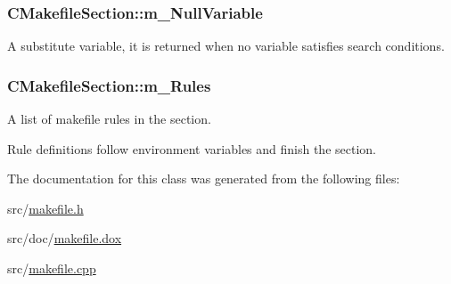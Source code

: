 \hypertarget{classCMakefileSection_ad9819eeb550fafffcfe7814ffd859cdd}{
\subsubsection[{m\-\_\-\-Null\-Variable}]{\setlength{\rightskip}{0pt plus 5cm}C\-Makefile\-Section\-::m\-\_\-\-Null\-Variable\hspace{0.3cm}{\ttfamily [private]}}}\label{classCMakefileSection_ad9819eeb550fafffcfe7814ffd859cdd}


A substitute variable, it is returned when no variable satisfies search conditions. 

\hypertarget{classCMakefileSection_aa5ba1d41937450d96795e4e08cb64f49}{
\subsubsection[{m\-\_\-\-Rules}]{\setlength{\rightskip}{0pt plus 5cm}C\-Makefile\-Section\-::m\-\_\-\-Rules\hspace{0.3cm}{\ttfamily [private]}}}\label{classCMakefileSection_aa5ba1d41937450d96795e4e08cb64f49}


A list of makefile rules in the section. 

Rule definitions follow environment variables and finish the section. 

The documentation for this class was generated from the following files\-:\begin{DoxyCompactItemize}
\item 
src/\hyperlink{makefile_8h}{makefile.\-h}\item 
src/doc/\hyperlink{makefile_8dox}{makefile.\-dox}\item 
src/\hyperlink{makefile_8cpp}{makefile.\-cpp}\end{DoxyCompactItemize}
